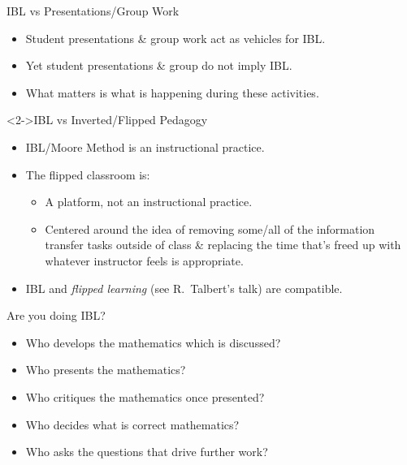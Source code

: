 \documentclass[10pt]{beamer}
\begin{document}

\begin{frame}

\begin{block}{IBL vs Presentations/Group Work}
\begin{itemize}
\item Student presentations \& group work act as vehicles for IBL. 
\item Yet student presentations \& group do not imply IBL. 
\item What matters is what is happening during these activities.
\end{itemize}
\end{block}

\begin{block}<2->{IBL vs Inverted/Flipped Pedagogy}
\begin{itemize}
\item<2-> IBL/Moore Method is an instructional practice.
\item<2-> The flipped classroom is:
    \begin{itemize}\normalsize
    \item<2-> A platform, not an instructional practice. 
    \item<2-> Centered around the idea of removing some/all of the information transfer tasks outside of class \& replacing the time that's freed up with whatever instructor feels is appropriate.
    \end{itemize}
\item<2-> IBL and \emph{flipped learning} (see R.~Talbert's talk) are compatible.
\end{itemize}
\end{block}

\end{frame}


\begin{frame}

\begin{block}{Are you doing IBL?}
\begin{itemize}
\item<2-> Who develops the mathematics which is discussed?
\item<3-> Who presents the mathematics?
\item<4-> Who critiques the mathematics once presented?
\item<5-> Who decides what is correct mathematics?
\item<6-> Who asks the questions that drive further work?
\end{itemize}
\end{block}

\end{frame}

\end{document}
